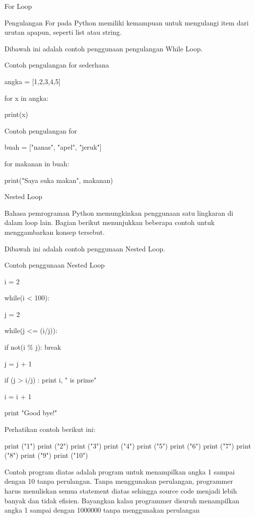  
For Loop 
 
Pengulangan For pada Python memiliki kemampuan untuk mengulangi item dari urutan apapun, seperti   list atau string. 
 
 

Dibawah ini adalah contoh penggunaan pengulangan While Loop. 
 


 
Contoh pengulangan for sederhana 
 

angka = [1,2,3,4,5] 
 

for x in angka: 
 

        print(x) 
 


Contoh pengulangan for 
 

buah = ["nanas", "apel", "jeruk"] 
 

for makanan in buah: 
 

        print("Saya suka makan", makanan) 
 



 
Nested Loop 

 
Bahasa pemrograman Python memungkinkan penggunaan satu lingkaran di dalam loop lain. Bagian berikut menunjukkan beberapa contoh untuk menggambarkan konsep tersebut.   

Dibawah ini adalah contoh penggunaan Nested Loop. 
 
Contoh penggunaan Nested Loop 
 


i = 2 
 

while(i < 100): 
 

        j = 2 
 

        while(j <= (i/j)): 
 

                if not(i   \%  j): break 
 

                j = j + 1 
 

        if (j > i/j) : print i, " is prime" 
 

        i = i + 1 
 


print "Good bye!" 


Perhatikan contoh berikut ini:

 

print ("1") 
print ("2") 
print ("3") 
print ("4") 
print ("5") 
print ("6") 
print ("7") 
print ("8") 
print ("9") 
print ("10") 


Contoh program diatas adalah program untuk menampilkan angka 1 sampai dengan 10 tanpa perulangan. Tanpa menggunakan perulangan, programmer harus menuliskan semua statement diatas sehingga source code menjadi lebih banyak dan tidak efisien. Bayangkan kalau programmer disuruh menampilkan angka 1 sampai dengan 1000000 tanpa menggunakan perulangan

